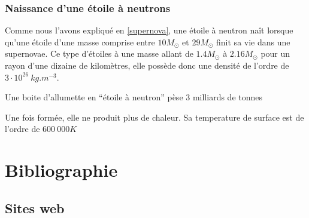 \documentclass[11pt]{book} %
\begin{document}
\subsection{Naissance d'une étoile à neutrons}
Comme nous l'avons expliqué en \ref{supernova}, une étoile à neutron naît lorsque qu'une étoile d'une masse comprise entre \(10M_\odot\) et \(29M_\odot\) finit sa vie dans une supernovae. Ce type d'étoiles à une masse allant de \(1.4M_\odot\) à \(2.16M_\odot\) pour un rayon d'une dizaine de kilomètres, elle possède donc une densité de l'ordre de \(3\cdot 10^{26}\ kg.m^{-3}\).
\begin{remark}
    Une boite d'allumette en ``étoile à neutron'' pèse 3 milliards de tonnes
\end{remark}
Une fois formée, elle ne produit plus de chaleur. Sa temperature de surface est de l'ordre de \(600\ 000K\)


\chapter*{Bibliographie}
\section*{Sites web}
\printbibliography[heading=bibempty,type=other]


\cleardoublepage
{}
\setlength{\columnsep}{0.75cm}
\printindex

\end{document}
